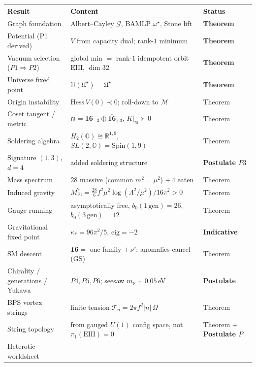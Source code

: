\begin{table}[h]
\centering
\renewcommand{\arraystretch}{1.25}
\begin{tabular}{lll}
\hline
\textbf{Result} & \textbf{Content} & \textbf{Status}\\
\hline
Graph foundation
  & Albert--Cayley $\mathcal{G}$, BAMLP $\omega^\star$, Stone lift
  & \textbf{Theorem}\\
Potential (P1 derived)
  & $V$ from capacity dual; rank-$1$ minimum
  & \textbf{Theorem}\\
Vacuum selection ($P1\Rightarrow P2$)
  & global min $=$ rank-$1$ idempotent orbit $\mathrm{EIII}$, $\dim 32$
  & \textbf{Theorem}\\
Universe fixed point
  & $\mathbb{U}(\mathfrak{U}^\star)=\mathfrak{U}^\star$
  & \textbf{Theorem}\\
Origin instability
  & $\mathrm{Hess}\,V(0)\prec0$; roll-down to $\mathcal{M}$
  & Theorem\\
Coset tangent / metric
  & $\mathfrak m=\mathbf{16}_{-3}\oplus\overline{\mathbf{16}}_{+3}$, $K|_{\mathfrak m}\succ0$
  & Theorem\\
Soldering algebra
  & $H_{2}(\mathbb{O})\cong\mathbb{R}^{1,9}$, $SL(2,\mathbb{O})=\mathrm{Spin}(1,9)$
  & Theorem\\
Signature $(1,3)$, $d=4$
  & added soldering structure
  & \textbf{Postulate $P3$}\\
Mass spectrum
  & $28$ massive (common $m^{2}=\mu^{2}$) $+\,4$ eaten
  & Theorem\\
Induced gravity
  & $M_{\mathrm{Pl}}^{2}=\tfrac{28}{6}f^{2}\mu^{2}\log(\Lambda^{2}/\mu^{2})/16\pi^{2}>0$
  & Theorem\\
Gauge running
  & asymptotically free, $b_{0}(1\,\mathrm{gen})=26$, $b_{0}(3\,\mathrm{gen})=12$
  & Theorem\\
Gravitational fixed point
  & $\kappa_{\ast}=96\pi^{2}/5$, $\mathrm{eig}=-2$
  & \textbf{Indicative}\\
SM descent
  & $\mathbf{16}=$ one family $+\,\nu^{c}$; anomalies cancel (GS)
  & Theorem\\
Chirality / generations / Yukawa
  & $P4,P5,P6$; seesaw $m_{\nu}\sim0.05$\,eV
  & \textbf{Postulate}\\
BPS vortex strings
  & finite tension $\mathcal{T}_{n}=2\pi f^{2}|n|\,\Omega$
  & Theorem\\
String topology
  & from gauged $U(1)$ config space, not $\pi_{1}(\mathrm{EIII})=0$
  & Theorem $+$ \textbf{Postulate $P$}\\
Heterotic worldsheet

\end{tabular}
\end{table}
